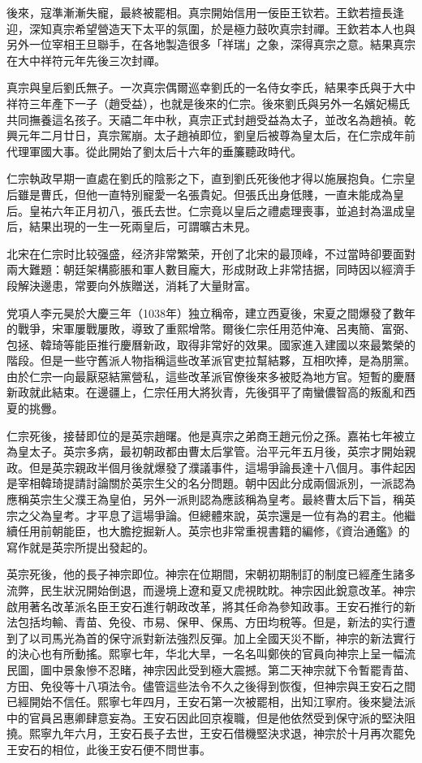 後來，寇準漸漸失寵，最終被罷相。真宗開始信用一佞臣王钦若。王欽若擅長逢迎，深知真宗希望營造天下太平的氛圍，於是極力鼓吹真宗封禪。王欽若本人也與另外一位宰相王旦聯手，在各地製造很多「祥瑞」之象，深得真宗之意。結果真宗在大中祥符元年先後三次封禪。

真宗與皇后劉氏無子。一次真宗偶爾巡幸劉氏的一名侍女李氏，結果李氏與于大中祥符三年產下一子（趙受益），也就是後來的仁宗。後來劉氏與另外一名嬪妃楊氏共同撫養這名孩子。天禧二年中秋，真宗正式封趙受益為太子，並改名為趙禎。乾興元年二月廿日，真宗駕崩。太子趙禎即位，劉皇后被尊為皇太后，在仁宗成年前代理軍國大事。從此開始了劉太后十六年的垂簾聽政時代。

仁宗執政早期一直處在劉氏的陰影之下，直到劉氏死後他才得以施展抱負。仁宗皇后雖是曹氏，但他一直特別寵愛一名張貴妃。但張氏出身低賤，一直未能成為皇后。皇祐六年正月初八，張氏去世。仁宗竟以皇后之禮處理喪事，並追封為溫成皇后，結果出現的一生一死兩皇后，可謂曠古未見。

北宋在仁宗时比较强盛，经济非常繁荣，开创了北宋的最顶峰，不过當時卻要面對兩大難題：朝廷架構膨脹和軍人數目龐大，形成財政上非常拮据，同時因以經濟手段解決邊患，常要向外族贈送，消耗了大量財富。

党項人李元昊於大慶三年（1038年）独立稱帝，建立西夏後，宋夏之間爆發了數年的戰爭，宋軍屢戰屢敗，導致了重熙增幣。爾後仁宗任用范仲淹、呂夷簡、富弼、包拯、韓琦等能臣推行慶曆新政，取得非常好的效果。國家進入建國以來最繁榮的階段。但是一些守舊派人物指稱這些改革派官吏拉幫結夥，互相吹捧，是為朋黨。由於仁宗一向最厭惡結黨營私，這些改革派官僚後來多被貶為地方官。短暫的慶曆新政就此結束。在邊疆上，仁宗任用大將狄青，先後弭平了南蠻儂智高的叛亂和西夏的挑釁。

仁宗死後，接替即位的是英宗趙曙。他是真宗之弟商王趙元份之孫。嘉祐七年被立為皇太子。英宗多病，最初朝政都由曹太后掌管。治平元年五月後，英宗才開始親政。但是英宗親政半個月後就爆發了濮議事件，這場爭論長達十八個月。事件起因是宰相韓琦提請討論關於英宗生父的名分問題。朝中因此分成兩個派別，一派認為應稱英宗生父濮王為皇伯，另外一派則認為應該稱為皇考。最終曹太后下旨，稱英宗之父為皇考。才平息了這場爭論。但總體來說，英宗還是一位有為的君主。他繼續任用前朝能臣，也大膽挖掘新人。英宗也非常重視書籍的編修，《資治通鑑》的寫作就是英宗所提出發起的。

英宗死後，他的長子神宗即位。神宗在位期間，宋朝初期制訂的制度已經產生諸多流弊，民生狀況開始倒退，而邊境上遼和夏又虎視眈眈。神宗因此銳意改革。神宗啟用著名改革派名臣王安石進行朝政改革，將其任命為參知政事。王安石推行的新法包括均輸、青苗、免役、市易、保甲、保馬、方田均稅等。但是，新法的实行遭到了以司馬光為首的保守派對新法強烈反彈。加上全國天災不斷，神宗的新法實行的決心也有所動搖。熙寧七年，华北大旱，一名名叫鄭俠的官員向神宗上呈一幅流民圖，圖中景象慘不忍睹，神宗因此受到極大震撼。第二天神宗就下令暫罷青苗、方田、免役等十八項法令。儘管這些法令不久之後得到恢復，但神宗與王安石之間已經開始不信任。熙寧七年四月，王安石第一次被罷相，出知江寧府。後來變法派中的官員呂惠卿肆意妄為。王安石因此回京複職，但是他依然受到保守派的堅決阻撓。熙寧九年六月，王安石長子去世，王安石借機堅決求退，神宗於十月再次罷免王安石的相位，此後王安石便不問世事。

